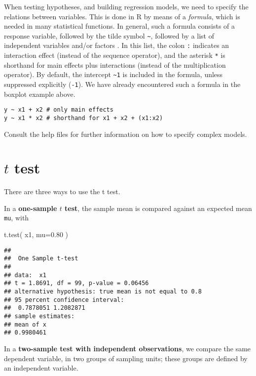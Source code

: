 \documentclass[
]{book}
\newenvironment{Shaded}{\begin{snugshade}}{\end{snugshade}}
\newcommand{\AttributeTok}[1]{\textcolor[rgb]{0.77,0.63,0.00}{#1}}
\newcommand{\FloatTok}[1]{\textcolor[rgb]{0.00,0.00,0.81}{#1}}
\newcommand{\FunctionTok}[1]{\textcolor[rgb]{0.00,0.00,0.00}{#1}}
\newcommand{\NormalTok}[1]{#1}
\begin{document}
When testing hypotheses, and building regression models, we need to
specify the relations between variables. This is done in
R by means of a \emph{formula}, which is needed in many
statistical functions. In general, such a formula consists of a
response variable, followed by the tilde symbol
{\texttt{\textasciitilde{}}}, followed by a list of independent
variables and/or factors \citep{wilk73}.
In this list, the colon
\texttt{:} indicates an interaction effect (instead
of the sequence operator), and the asterisk
\texttt{*} is shorthand for main effects plus
interactions (instead of the multiplication operator).
By default,
the intercept \texttt{\textasciitilde{}1} is included in the
formula, unless suppressed explicitly
(\texttt{-1}). We have already encountered such a formula
in the boxplot example above.

\begin{verbatim}
y ~ x1 + x2 # only main effects 
y ~ x1 * x2 # shorthand for x1 + x2 + (x1:x2) 
\end{verbatim}

Consult the help files for further information on how to specify
complex models.

\hypertarget{t-test}{%
\section{\texorpdfstring{\(t\) test}{t test}}\label{t-test}}

There are three ways to use the t test.

In a \textbf{one-sample \(t\) test}, the sample mean is compared against an expected mean \texttt{mu},
with

\begin{Shaded}
\begin{Highlighting}[]
\FunctionTok{t.test}\NormalTok{( x1, }\AttributeTok{mu=}\FloatTok{0.80}\NormalTok{ )}
\end{Highlighting}
\end{Shaded}

\begin{verbatim}
## 
##  One Sample t-test
## 
## data:  x1
## t = 1.8691, df = 99, p-value = 0.06456
## alternative hypothesis: true mean is not equal to 0.8
## 95 percent confidence interval:
##  0.7878051 1.2082871
## sample estimates:
## mean of x 
## 0.9980461
\end{verbatim}

In a \textbf{two-sample test with independent observations}, we compare
the same dependent variable, in two groups of sampling units; these groups are defined by an independent variable.
\end{document}
